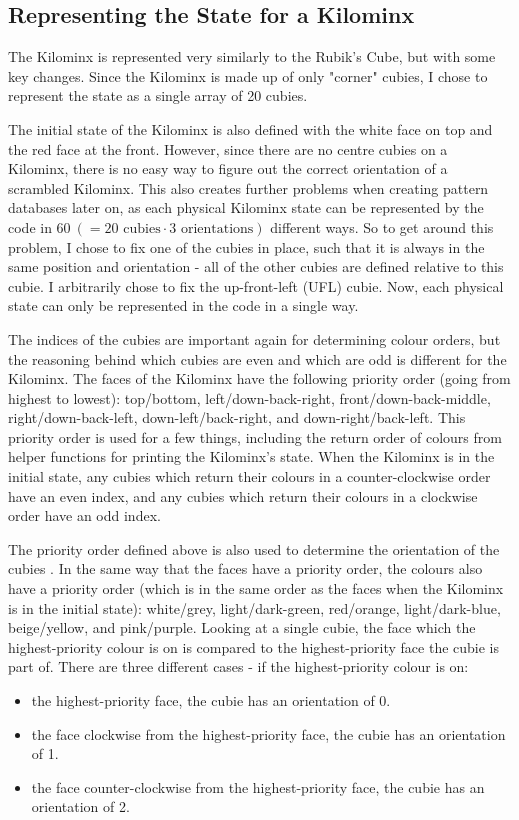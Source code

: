 \subsection{Representing the State for a Kilominx}
The Kilominx is represented very similarly to the Rubik's Cube, but with some key changes. Since the Kilominx is made up of only "corner" cubies, I chose to represent the state as a single array of 20 cubies.

The initial state of the Kilominx is also defined with the white face on top and the red face at the front. However, since there are no centre cubies on a Kilominx, there is no easy way to figure out the correct orientation of a scrambled Kilominx. This also creates further problems when creating pattern databases later on, as each physical Kilominx state can be represented by the code in $60\ (= 20 \text{ cubies} \cdot 3 \text{ orientations})$ different ways. So to get around this problem, I chose to fix one of the cubies in place, such that it is always in the same position and orientation - all of the other cubies are defined relative to this cubie. I arbitrarily chose to fix the up-front-left (UFL) cubie. Now, each physical state can only be represented in the code in a single way.

The indices of the cubies are important again for determining colour orders, but the reasoning behind which cubies are even and which are odd is different for the Kilominx. The faces of the Kilominx have the following priority order (going from highest to lowest): top/bottom, left/down-back-right, front/down-back-middle, right/down-back-left, down-left/back-right, and down-right/back-left. This priority order is used for a few things, including the return order of colours from helper functions for printing the Kilominx's state. When the Kilominx is in the initial state, any cubies which return their colours in a counter-clockwise order have an even index, and any cubies which return their colours in a clockwise order have an odd index.


The priority order defined above is also used to determine the orientation of the cubies \cite{kilominxorientation}. In the same way that the faces have a priority order, the colours also have a priority order (which is in the same order as the faces when the Kilominx is in the initial state): white/grey, light/dark-green, red/orange, light/dark-blue, beige/yellow, and pink/purple. Looking at a single cubie, the face which the highest-priority colour is on is compared to the highest-priority face the cubie is part of. There are three different cases - if the highest-priority colour is on:
\begin{itemize}
    \item the highest-priority face, the cubie has an orientation of 0.
    \item the face clockwise from the highest-priority face, the cubie has an orientation of 1.
    \item the face counter-clockwise from the highest-priority face, the cubie has an orientation of 2.
\end{itemize}

